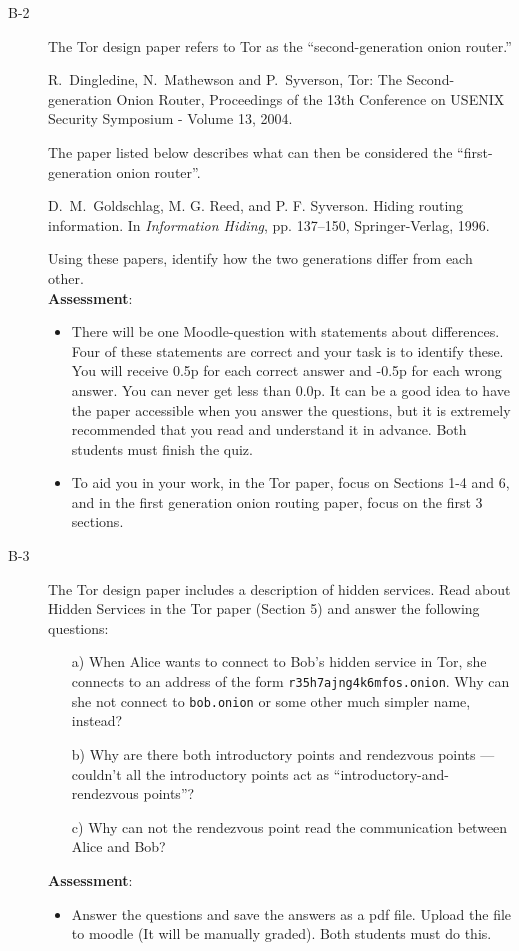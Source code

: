 \documentclass{article}
\begin{document}
\begin{description}
	\item[B-2]{The Tor design paper refers to Tor as the ``second-generation onion router.'' 
		\begin{center}
			\begin{minipage}{0.8\textwidth}
				R.~Dingledine, N.~Mathewson and P.~Syverson, Tor: The Second-generation Onion Router, Proceedings of the 13th Conference on USENIX Security Symposium - Volume 13, 2004.
			\end{minipage}
		\end{center}
		The paper listed below describes what can then be considered the ``first-generation onion router''.
		\begin{center}
			\begin{minipage}{0.8\textwidth}
				D.~M.~Goldschlag, M. G. Reed, and P. F. Syverson. Hiding routing information. In \textit{Information Hiding}, pp. 137--150, Springer-Verlag, 1996.
			\end{minipage}
		\end{center}
		Using these papers, identify how the two generations differ from each other.\\
		\textbf{Assessment}:
		\begin{itemize}
			\item There will be one Moodle-question with statements about differences. Four of these statements are correct and your task is to identify these. You will receive 0.5p for each correct answer and -0.5p for each wrong answer. You can never get less than 0.0p. It can be a good idea to have the paper accessible when you answer the questions, but it is extremely recommended that you read and understand it in advance. Both students must finish the quiz.
			\item To aid you in your work, in the Tor paper, focus on Sections 1-4 and 6, and in the first generation onion routing paper, focus on the first 3 sections. 
		\end{itemize}
	}
	
	\item[B-3]{The Tor design paper includes a description of hidden services. Read about Hidden Services in the Tor paper (Section 5) and answer the following questions:
		\begin{itemize}
			\item[a)] When Alice wants to connect to Bob's hidden service in Tor, she connects to an address of the form \verb+r35h7ajng4k6mfos.onion+. Why can she not connect to \verb+bob.onion+ or some other much simpler name, instead? 
			\item[b)] Why are there both introductory points and rendezvous points --- couldn't all the introductory points act as ``introductory-and-rendezvous points''?
			\item[c)] Why can not the rendezvous point read the communication between Alice and Bob?
		\end{itemize} 
		\textbf{Assessment}:
		\begin{itemize}
			\item Answer the questions and save the answers as a pdf file. Upload the file to moodle (It will be manually graded). Both students must do this.
		\end{itemize}
	}
	

\end{description}
\end{document}
